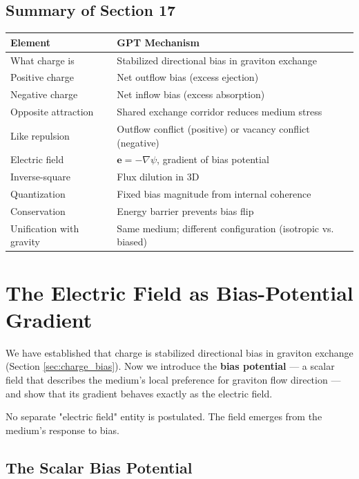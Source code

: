 \documentclass[12pt, a4paper]{article}
\begin{document}
\subsection{Summary of Section 17}
\label{subsec:summary_17}

\begin{center}
\begin{tabular}{|p{4cm}|p{10cm}|}
\hline
\textbf{Element} & \textbf{GPT Mechanism} \\
\hline
What charge is & Stabilized directional bias in graviton exchange \\
\hline
Positive charge & Net outflow bias (excess ejection) \\
\hline
Negative charge & Net inflow bias (excess absorption) \\
\hline
Opposite attraction & Shared exchange corridor reduces medium stress \\
\hline
Like repulsion & Outflow conflict (positive) or vacancy conflict (negative) \\
\hline
Electric field & \( \mathbf{e} = -\nabla \psi \), gradient of bias potential \\
\hline
Inverse-square & Flux dilution in 3D \\
\hline
Quantization & Fixed bias magnitude from internal coherence \\
\hline
Conservation & Energy barrier prevents bias flip \\
\hline
Unification with gravity & Same medium; different configuration (isotropic vs. biased) \\
\hline
\end{tabular}
\end{center}
\section{The Electric Field as Bias-Potential Gradient}
\label{sec:electric_field}

We have established that charge is stabilized directional bias in graviton exchange (Section \ref{sec:charge_bias}). Now we introduce the \textbf{bias potential} — a scalar field that describes the medium's local preference for graviton flow direction — and show that its gradient behaves exactly as the electric field.

No separate "electric field" entity is postulated. The field emerges from the medium's response to bias.

\subsection{The Scalar Bias Potential}
\label{subsec:scalar_bias_potential}
\end{document}
